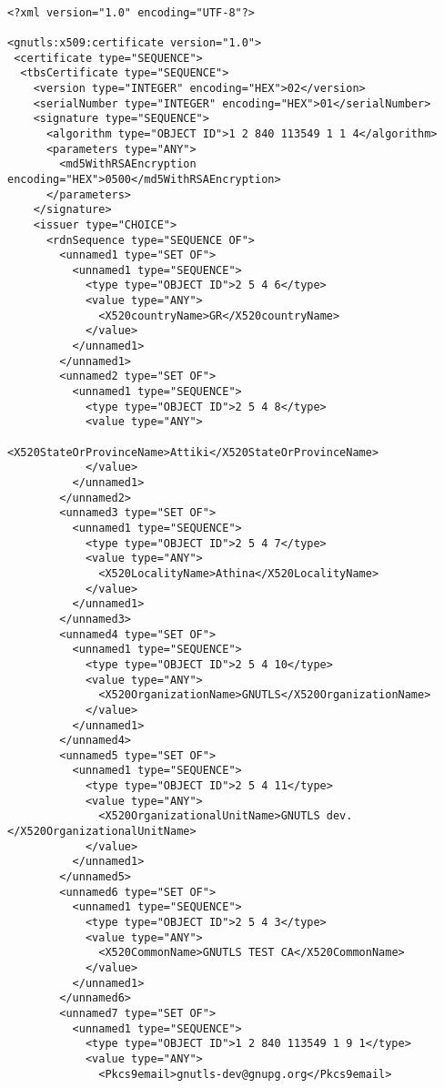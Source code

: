 \begin{verbatim}

<?xml version="1.0" encoding="UTF-8"?>

<gnutls:x509:certificate version="1.0">
 <certificate type="SEQUENCE">
  <tbsCertificate type="SEQUENCE">
    <version type="INTEGER" encoding="HEX">02</version>
    <serialNumber type="INTEGER" encoding="HEX">01</serialNumber>
    <signature type="SEQUENCE">
      <algorithm type="OBJECT ID">1 2 840 113549 1 1 4</algorithm>
      <parameters type="ANY">
        <md5WithRSAEncryption encoding="HEX">0500</md5WithRSAEncryption>
      </parameters>
    </signature>
    <issuer type="CHOICE">
      <rdnSequence type="SEQUENCE OF">
        <unnamed1 type="SET OF">
          <unnamed1 type="SEQUENCE">
            <type type="OBJECT ID">2 5 4 6</type>
            <value type="ANY">
              <X520countryName>GR</X520countryName>
            </value>
          </unnamed1>
        </unnamed1>
        <unnamed2 type="SET OF">
          <unnamed1 type="SEQUENCE">
            <type type="OBJECT ID">2 5 4 8</type>
            <value type="ANY">
              <X520StateOrProvinceName>Attiki</X520StateOrProvinceName>
            </value>
          </unnamed1>
        </unnamed2>
        <unnamed3 type="SET OF">
          <unnamed1 type="SEQUENCE">
            <type type="OBJECT ID">2 5 4 7</type>
            <value type="ANY">
              <X520LocalityName>Athina</X520LocalityName>
            </value>
          </unnamed1>
        </unnamed3>
        <unnamed4 type="SET OF">
          <unnamed1 type="SEQUENCE">
            <type type="OBJECT ID">2 5 4 10</type>
            <value type="ANY">
              <X520OrganizationName>GNUTLS</X520OrganizationName>
            </value>
          </unnamed1>
        </unnamed4>
        <unnamed5 type="SET OF">
          <unnamed1 type="SEQUENCE">
            <type type="OBJECT ID">2 5 4 11</type>
            <value type="ANY">
              <X520OrganizationalUnitName>GNUTLS dev.</X520OrganizationalUnitName>
            </value>
          </unnamed1>
        </unnamed5>
        <unnamed6 type="SET OF">
          <unnamed1 type="SEQUENCE">
            <type type="OBJECT ID">2 5 4 3</type>
            <value type="ANY">
              <X520CommonName>GNUTLS TEST CA</X520CommonName>
            </value>
          </unnamed1>
        </unnamed6>
        <unnamed7 type="SET OF">
          <unnamed1 type="SEQUENCE">
            <type type="OBJECT ID">1 2 840 113549 1 9 1</type>
            <value type="ANY">
              <Pkcs9email>gnutls-dev@gnupg.org</Pkcs9email>

\end{verbatim}
